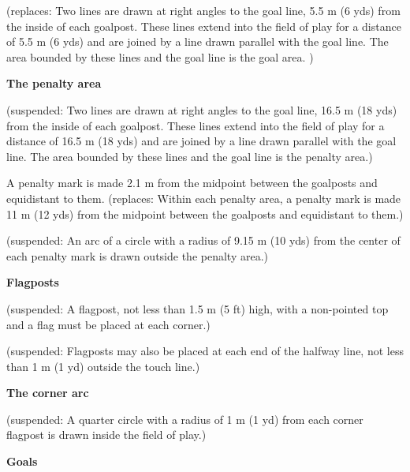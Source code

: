 {\color[rgb]{0.4,0.4,0.4}
(replaces: Two lines are drawn at right angles to the goal line, 5.5 m (6 yds) from the inside of each goalpost. These lines extend into the field of play for a distance of 5.5 m (6 yds) and are joined by a line drawn parallel with the goal line. The area bounded by these lines and
the goal line is the goal area. )}

\bigskip

{\bfseries The penalty area }

\headlinebox

{\color[rgb]{0.4,0.4,0.4}
(suspended: Two lines are drawn at right angles to the goal line, 16.5 m (18 yds) from the inside of each goalpost. These lines extend into the field of play for a distance of 16.5 m (18 yds) and are joined by a line drawn parallel with the goal line. The area bounded by these lines and the goal line is the penalty area.) }

\bigskip

A penalty mark is made 2.1 m from the midpoint between the goalposts and equidistant to them. 
\textcolor[rgb]{0.4,0.4,0.4}{(replaces: Within each penalty area, a penalty mark is made 11 m (12 yds) from the midpoint between the goalposts and equidistant to them.)}

\bigskip

{\color[rgb]{0.4,0.4,0.4}
(suspended: An arc of a circle with a radius of 9.15 m (10 yds) from the center of each penalty mark is drawn outside the penalty area.)}


\bigskip

{\textbf{Flagposts} }

\headlinebox

{\color[rgb]{0.4,0.4,0.4}
(suspended: A flagpost, not less than 1.5 m (5 ft) high, with a non-pointed top and a flag must be placed at each corner.) }

\bigskip

{\color[rgb]{0.4,0.4,0.4}
(suspended: Flagposts may also be placed at each end of the halfway line, not less than 1 m (1 yd) outside the touch line.)}

\bigskip

{\bfseries The corner arc }

\headlinebox

{\color[rgb]{0.4,0.4,0.4}
(suspended: A quarter circle with a radius of 1 m (1 yd) from each corner flagpost is drawn inside the field of play.)}

\bigskip

{\bfseries Goals }

